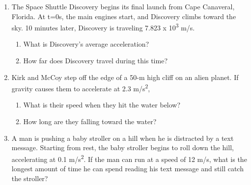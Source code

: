 \documentclass[letterpaper, 12pt]{article}
\begin{document}
\begin{enumerate}
	\item The Space Shuttle Discovery begins its final launch from Cape Canaveral, Florida.  At t=0s, the main engines start, and Discovery climbs toward the sky.  10 minutes later, Discovery is traveling 7.823 x 10\textsuperscript{3} m/s.
	\begin{enumerate}
		\item What is Discovery's average acceleration?
		\vspace{.75in}
		\item How far does Discovery travel during this time? 
		\vspace{.75in}
	\end{enumerate}
	\item Kirk and McCoy step off the edge of a 50-m high cliff on an alien planet.  If gravity causes them to accelerate at 2.3 m/s\textsuperscript{2},
	\begin{enumerate}
		\item What is their speed when they hit the water below?
		\vspace{.75in}
		\item How long are they falling toward the water?
		\vspace{.75in}
	\end{enumerate}

	\item A man is pushing a baby stroller on a hill when he is distracted by a text message.  Starting from rest, the baby stroller begins to roll down the hill, accelerating at 0.1 m/s\textsuperscript{2}.  If the man can run at a speed of 12 m/s, what is the longest amount of time he can spend reading his text message and still catch the stroller?







	
\end{enumerate}
 
\end{document}
